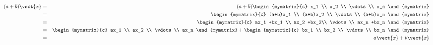 \begin{solution}
\begin{itemize}
\begin{eqnarray*} 
(a+b)\vect{x} &=& 
(a+b) \begin{mymatrix}{c}
x_1 \\
x_2 \\
\vdots \\
x_n
\end{mymatrix}
\\
&=& 
\begin{mymatrix}{c}
(a+b)x_1 \\
(a+b)x_2 \\
\vdots \\
(a+b)x_n
\end{mymatrix} \\
&=&
\begin{mymatrix}{c}
ax_1 +bx_1 \\
ax_2 +bx_2\\
\vdots \\
ax_n +bx_n
\end{mymatrix} \\
&=&
\begin{mymatrix}{c}
ax_1 \\
ax_2 \\
\vdots \\
ax_n
\end{mymatrix} +
\begin{mymatrix}{c}
bx_1 \\
bx_2 \\
\vdots \\
bx_n
\end{mymatrix} \\
&=& a\vect{x} + b\vect{x}
\end{eqnarray*}


\end{itemize}
\end{solution}
